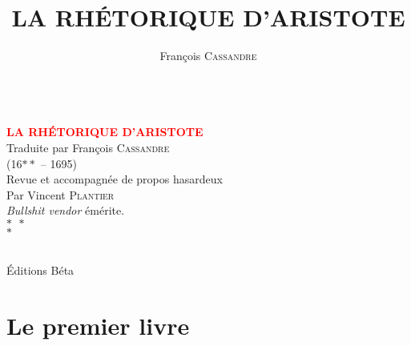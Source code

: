 \documentclass[11pt]{book}
\title{LA RHÉTORIQUE D'ARISTOTE}
\author{François \textsc{Cassandre}}
\begin{document}
\begin{titlepage}

	\centering
	
	~\\[\baselineskip] 

	\textcolor{Red}{\textbf{\Huge LA RHÉTORIQUE D'ARISTOTE}}\\[1.6\baselineskip] 
	
	{\LARGE Traduite par François \textsc{Cassandre}}\\{\small(16$**$ -- 1695)}\\[2.6\baselineskip]
	
	Revue et accompagnée de propos hasardeux\\[0.6\baselineskip] 
	
	\Large Par Vincent P\textsc{lantier}\\[0.6\baselineskip]
	
	{	\footnotesize \emph{Bullshit vendor} émérite.\\$*~~*$\\$*$\\
	}

	\vfill 
	
	\\[0.5\baselineskip]
	
	Éditions Béta

\end{titlepage}


\renewcommand{\headrulewidth}{0pt}




\part{Le premier livre}

\renewcommand{\headrulewidth}{1pt}












\end{document}
